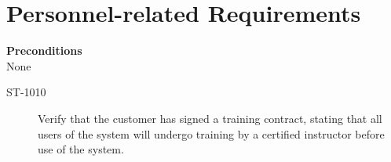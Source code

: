 \section{Personnel-related Requirements}

\textbf{Preconditions} \\	
None
~\

\begin{description}
\item[ST-1010] Verify that the customer has signed a training contract, stating that all users of the system will undergo training by a certified instructor before use of the system. 
\end{description}

